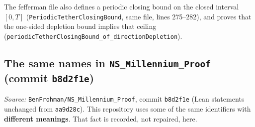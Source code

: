 \documentclass[11pt]{article}
\theoremstyle{plain}
\theoremstyle{definition}
\theoremstyle{remark}
\newcommand{\nssha}{b8d2f1e}
\begin{document}
The fefferman file also defines a periodic closing bound on the closed interval \([0,T]\) (\texttt{PeriodicTetherClosingBound}, same file, lines 275--282), and proves that the one-sided depletion bound implies that ceiling (\texttt{periodicTetherClosingBound\_\hspace{0pt}of\_\hspace{0pt}directionDepletion}).

\subsection[The same names in NS\_Millennium\_Proof (commit b8d2f1e)]{The same names in \texttt{NS\_Millennium\_Proof} (commit \texttt{\nssha})}

\textit{Source:} \texttt{BenFrohman/\hspace{0pt}NS\_\hspace{0pt}Millennium\_\hspace{0pt}Proof}, commit \texttt{\nssha} (Lean statements unchanged from \texttt{aa9d28c}). This repository uses some of the same identifiers with \textbf{different meanings}. That fact is recorded, not repaired, here.
\end{document}
